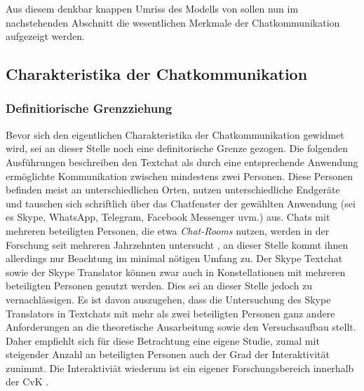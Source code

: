 Aus diesem denkbar knappen Umriss des Modells von \citeauthor{koch_gesprochene_2011} sollen nun im nachstehenden Abschnitt die wesentlichen Merkmale der Chatkommunikation aufgezeigt werden.

%

\subsection{Charakteristika der Chatkommunikation}
\label{K2:subsec:characteristika-chat}

\subsubsection{Definitiorische Grenzziehung}
Bevor sich den eigentlichen Charakteristika der Chatkommunikation gewidmet wird, sei an dieser Stelle noch eine definitorische Grenze gezogen. Die folgenden Ausführungen beschreiben den Textchat als durch eine entsprechende Anwendung ermöglichte Kommunikation zwischen mindestens zwei Personen. Diese Personen befinden meist an unterschiedlichen Orten, nutzen unterschiedliche Endgeräte und tauschen sich schriftlich über das Chatfenster der gewählten Anwendung (sei es Skype, WhatsApp, Telegram, Facebook Messenger uvm.) aus. Chats mit mehreren beteiligten Personen, die etwa \emph{Chat-Rooms} nutzen, werden in der Forschung seit mehreren Jahrzehnten untersucht \citep[vgl. z.\,B.][]{beiswenger_eyetracking_2017, schweiger_handbuch_2019}, an dieser Stelle kommt ihnen allerdings nur Beachtung im minimal nötigen Umfang zu. Der Skype Textchat sowie der Skype Translator können zwar auch in Konstellationen mit mehreren beteiligten Personen genutzt werden. Dies sei an dieser Stelle jedoch zu vernachlässigen. Es ist davon auszugehen, dass die Untersuchung des Skype Translators in Textchats mit mehr als zwei beteiligten Personen ganz andere Anforderungen an die theoretische Ausarbeitung sowie den Versuchsaufbau stellt. Daher empfiehlt sich für diese Betrachtung eine eigene Studie, zumal mit steigender Anzahl an beteiligten Personen auch der Grad der Interaktivität zunimmt. Die Interaktiviät wiederum ist ein eigener Forschungsbereich innerhalb der CvK \citep[vgl. hierzu bspw.][]{beiswenger_eyetracking_2017, durscheid_personale_2018}.




